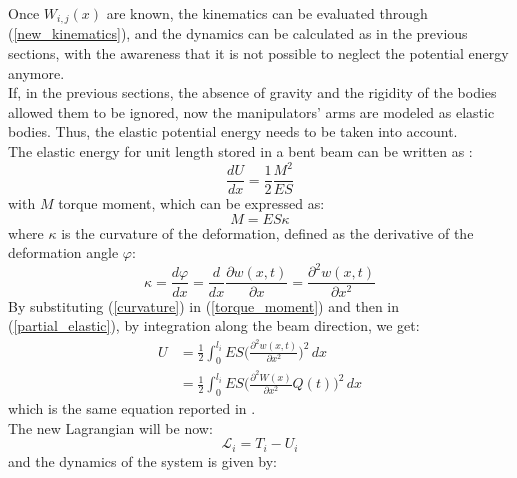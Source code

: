 \documentclass[a4paper,12pt,oneside]{report}
\begin{document}
Once $W_{i,j}(x)$ are known, the kinematics can be evaluated through (\ref{new_kinematics}), and the dynamics can be calculated as in the previous sections, with the awareness that it is not possible to neglect the potential energy anymore.\\
If, in the previous sections, the absence of gravity and the rigidity of the bodies allowed them to be ignored, now the manipulators' arms are modeled as elastic bodies. Thus, the elastic potential energy needs to be taken into account.\\
The elastic energy for unit length stored in a bent beam can be written as \cite{book}:
\begin{equation}
  \frac{dU}{dx}=\frac{1}{2}\frac{M^2}{ES}
  \label{partial_elastic}
\end{equation}
with $M$ torque moment, which can be expressed as:
\begin{equation}
  M=ES\kappa
  \label{torque_moment}
\end{equation}
where $\kappa$ is the curvature of the deformation, defined as the derivative of the deformation angle $\varphi$:
\begin{equation}
  \kappa=\frac{d\varphi}{dx}=\frac{d}{dx}\frac{\partial w(x,t)}{\partial x}=\frac{\partial^2 w(x,t)}{\partial x^2}
  \label{curvature}
\end{equation}
By substituting (\ref{curvature}) in (\ref{torque_moment}) and then in (\ref{partial_elastic}), by integration along the beam direction, we get:
\begin{equation}
  \begin{split}
  U&=\frac{1}{2}\int_{0}^{l_i}ES\Big(\frac{\partial^2 w(x,t)}{\partial x^2}\Big)^2\,dx\\
   &=\frac{1}{2}\int_{0}^{l_i}ES\Big(\frac{\partial^2 W(x)}{\partial x^2}Q(t)\Big)^2\,dx
  \end{split}
\end{equation}
which is the same equation reported in \cite{seventeen,eighteen}.\\
The new Lagrangian will be now:
\begin{equation}
  \mathcal{L}_i = T_i-U_i
\end{equation}
and the dynamics of the system is given by:
\end{document}
